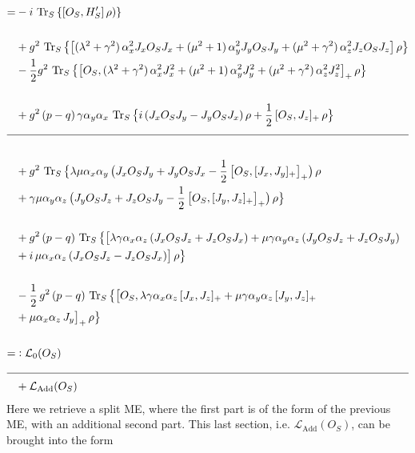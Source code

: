 \documentclass{article}
\begin{document}
\begin{align*}
    =&
    -i\,\operatorname{Tr}_S\left\{[O_S,H_S']\,\rho)\right\}\\\\
    &+g^2\,\operatorname{Tr}_S\big\{\big[(\lambda^2+\gamma^2)\,\alpha_x^2J_xO_S J_x+(\mu^2+1)\,\alpha_y^2 J_y O_S J_y+(\mu^2+\gamma^2)\,\alpha_z^2 J_z O_S J_z\big]\,\rho\big\}\\
    &-\half g^2\,\operatorname{Tr}_S\big\{\big[O_S,(\lambda^2+\gamma^2)\,\alpha_x^2J_x^2+(\mu^2+1)\,\alpha_y^2 J_y^2+(\mu^2+\gamma^2)\,\alpha_z^2 J_z^2\big]_+\,\rho\big\}\\\\
        &+g^2\,(p-q)\,\gamma\alpha_y\alpha_x\,\operatorname{Tr}_S\big\{i\,(J_x O_S J_y-J_y O_S J_x)\,\rho+\half\,[O_S, J_z]_+\,\rho\big\}\\\cline{1-2}\\
    &+g^2\,\operatorname{Tr}_S\big\{\lambda\mu\alpha_x\alpha_y\,\big(J_x O_S J_y + J_y O_S J_x-\half\,\big[O_S,[J_x, J_y]_+\big]_+\big)\,\rho \\
    &+\gamma\mu\alpha_y\alpha_z\,\big(J_y O_S J_z + J_z O_S J_y-\half\,\big[O_S,[J_y,  J_z]_+\big]_+\big)\,\rho\big\}\\\\
    &+g^2\,(p-q)\,\operatorname{Tr}_S\big\{\big[\lambda\gamma\alpha_x\alpha_z\,(J_x O_S J_z+J_z O_S J_x)+\mu\gamma\alpha_y\alpha_z\,(J_y O_S J_z+J_z O_S J_y)\\
    &+i\,\mu\alpha_x\alpha_z\,(J_x O_S J_z-J_z O_S J_x)\big]\,\rho\big\}\\\\
    &-\half\,g^2\,(p-q)\,\operatorname{Tr}_S\big\{\big[O_S,\lambda\gamma\alpha_x\alpha_z\,[J_x, J_z]_+ + \mu\gamma\alpha_y\alpha_z\,[J_y, J_z]_+\\
    &+\mu\alpha_x\alpha_z\,J_y\big]_+\,\rho\big\}\\\\
    =&\vcentcolon \mathcal{L}_0(O_S)\\
    \cline{1-2}
    &+\mathcal{L}_{\text{Add}}(O_S)
\end{align*}
Here we retrieve a split ME, where the first part is of the form of the previous ME, with an additional second part. This last section, i.e. $\mathcal{L}_{\text{Add}}(O_S)$, can be brought into the form
\end{document}
